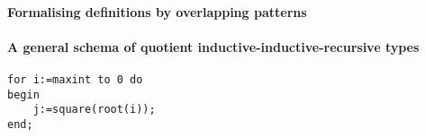 \documentclass[a4paper,UKenglish,numberwithinsect,cleveref,thm-restate]{lipics-v2021}
\begin{document}
\paragraph*{Formalising definitions by overlapping patterns}

\paragraph*{A general schema of quotient inductive-inductive-recursive types}


\appendix

\begin{conjecture}\label{testenv-conjecture}
\end{conjecture}

\begin{claim}\label{testenv-claim}
\end{claim}

\begin{claim*}\label{testenv-claim2}
\end{claim*}

\begin{claimproof}
\end{claimproof}
\begin{lstlisting}[caption={Formal definition in \Agda},label=list:8-6,captionpos=t,float,abovecaptionskip=-\medskipamount]
for i:=maxint to 0 do 
begin 
    j:=square(root(i));
end;
\end{lstlisting}
\end{document}

